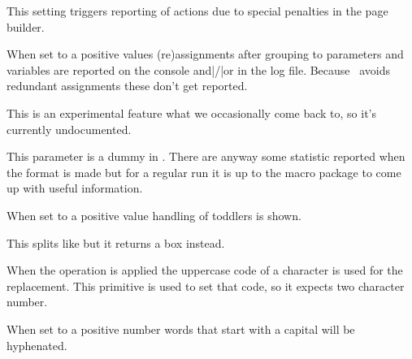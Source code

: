 \stopnewprimitive

\startnewprimitive[title={\prm {tracingpenalties}}]

This setting triggers reporting of actions due to special penalties in the
page builder.

\stopnewprimitive


\startoldprimitive[title={\prm {tracingrestores}}]

When set to a positive values (re)assignments after grouping to parameters and
variables are reported on the console and|/|or in the log file. Because
\LUAMETATEX\ avoids redundant assignments these don't get reported.

\stopoldprimitive

\startnewprimitive[title={\prm {tracingsnapping}}]

This is an experimental feature what we occasionally come back to, so it's
currently undocumented.

\stopnewprimitive

\startoldprimitive[title={\prm {tracingstats}}]

This parameter is a dummy in \LUAMETATEX. There are anyway some statistic
reported when the format is made but for a regular run it is up to the macro
package to come up with useful information.

\stopoldprimitive

\startnewprimitive[title={\prm {tracingtoddlers}}]

When set to a positive value handling of toddlers is shown.

\stopnewprimitive

\startnewprimitive[title={\prm {tsplit}}]

This splits like  but it returns a  box instead.

\stopnewprimitive

\startoldprimitive[title={\prm {uccode}}]

When the  operation is applied the uppercase code of a character
is used for the replacement. This primitive is used to set that code, so it
expects two character number.

\stopoldprimitive

\startoldprimitive[title={\prm {uchyph}}]

When set to a positive number words that start with a capital will be hyphenated.

